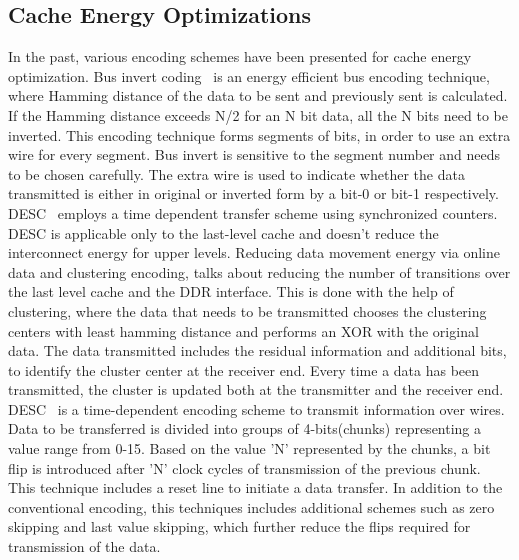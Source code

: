 \subsection{Cache Energy Optimizations}
In the past, various encoding schemes have been presented for cache energy optimization. Bus invert coding~\cite{bus-invert}  is an energy efficient bus encoding technique, where Hamming distance of the data to be sent and  previously sent is calculated. If the Hamming distance exceeds N/2 for an N bit data, all the N bits need to be inverted. This encoding technique forms segments of bits, in order to use an extra wire for every segment. Bus invert is sensitive to the segment number and needs to be chosen carefully. The extra wire is used to indicate whether the data transmitted is either in original or inverted form by a bit-0 or bit-1 respectively. 
DESC~\cite{desc} employs a time dependent transfer scheme using synchronized counters. DESC is applicable only to the last-level cache and doesn't reduce the interconnect energy for upper levels. Reducing data movement energy via online data and clustering encoding, talks about reducing the number of transitions over the last level cache and the DDR interface. This is done with the help of clustering, where the data that needs to be transmitted chooses the clustering centers with least hamming distance and performs an XOR with the original data. The data transmitted includes the residual information and additional bits, to identify the cluster center at the receiver end. Every time a data has been transmitted, the cluster is updated both at the transmitter and the receiver end.
DESC~\cite{desc} is a time-dependent encoding scheme to transmit information over wires. Data to be transferred is divided into groups of 4-bits(chunks) representing a value range from 0-15. Based on the value 'N' represented by the chunks, a bit flip is introduced after 'N' clock cycles of transmission of the previous chunk. This technique includes a reset line to initiate a data transfer. In addition to the conventional encoding, this techniques includes additional schemes such as zero skipping and last value skipping, which further reduce the flips required for transmission of the data.




  
